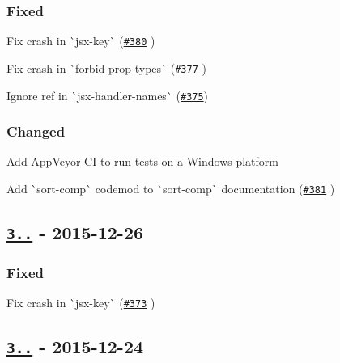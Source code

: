 \subsubsection*{Fixed}


\begin{DoxyItemize}
\item Fix crash in \`{}jsx-\/key\`{} (\href{https://github.com/yannickcr/eslint-plugin-react/pull/380}{\tt \#380} )
\item Fix crash in \`{}forbid-\/prop-\/types\`{} (\href{https://github.com/yannickcr/eslint-plugin-react/pull/377}{\tt \#377} )
\item Ignore {\ttfamily ref} in \`{}jsx-\/handler-\/names\`{} (\href{https://github.com/yannickcr/eslint-plugin-react/issues/375}{\tt \#375})
\end{DoxyItemize}

\subsubsection*{Changed}


\begin{DoxyItemize}
\item Add App\+Veyor CI to run tests on a Windows platform
\item Add \`{}sort-\/comp\`{} codemod to \`{}sort-\/comp\`{} documentation (\href{https://github.com/yannickcr/eslint-plugin-react/pull/381}{\tt \#381} )
\end{DoxyItemize}

\subsection*{\href{https://github.com/yannickcr/eslint-plugin-react/compare/v3.13.0...v3.13.1}{\tt 3..} -\/ 2015-\/12-\/26}

\subsubsection*{Fixed}


\begin{DoxyItemize}
\item Fix crash in \`{}jsx-\/key\`{} (\href{https://github.com/yannickcr/eslint-plugin-react/issues/373}{\tt \#373} )
\end{DoxyItemize}

\subsection*{\href{https://github.com/yannickcr/eslint-plugin-react/compare/v3.12.0...v3.13.0}{\tt 3..} -\/ 2015-\/12-\/24}

